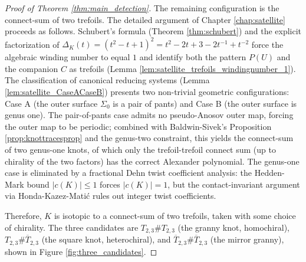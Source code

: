 \begin{proof}[Proof of Theorem \ref{thm:main_detection}]
The remaining configuration is the connect-sum of two trefoils. The detailed argument of Chapter \ref{chap:satellite} proceeds as follows. Schubert's formula (Theorem \ref{thm:schubert}) and the explicit factorization of $\Delta_K(t) = (t^2-t+1)^2 = t^2 - 2t + 3 - 2t^{-1} + t^{-2}$ force the algebraic winding number to equal $1$ and identify both the pattern $P(U)$ and the companion $C$ as trefoils (Lemma \ref{lem:satellite_trefoils_windingnumber_1}). The classification of canonical reducing systems (Lemma \ref{lem:satellite_CaseACaseB}) presents two non-trivial geometric configurations: Case A (the outer surface $\Sigma_0$ is a pair of pants) and Case B (the outer surface is genus one). The pair-of-pants case admits no pseudo-Anosov outer map, forcing the outer map to be periodic; combined with Baldwin-Sivek's Proposition \ref{prop:knottracesprop} and the genus-two constraint, this yields the connect-sum of two genus-one knots, of which only the trefoil-trefoil connect sum (up to chirality of the two factors) has the correct Alexander polynomial. The genus-one case is eliminated by a fractional Dehn twist coefficient analysis: the Hedden-Mark bound $|c(K)| \le 1$ forces $|c(K)| = 1$, but the contact-invariant argument via Honda-Kazez-Mati\'{c} rules out integer twist coefficients.

Therefore, $K$ is isotopic to a connect-sum of two trefoils, taken with some choice of chirality. The three candidates are $T_{2,3} \# T_{2,3}$ (the granny knot, homochiral), $T_{2,3} \# \overline{T}_{2,3}$ (the square knot, heterochiral), and $\overline{T}_{2,3} \# \overline{T}_{2,3}$ (the mirror granny), shown in Figure \ref{fig:three_candidates}.


\end{proof}
